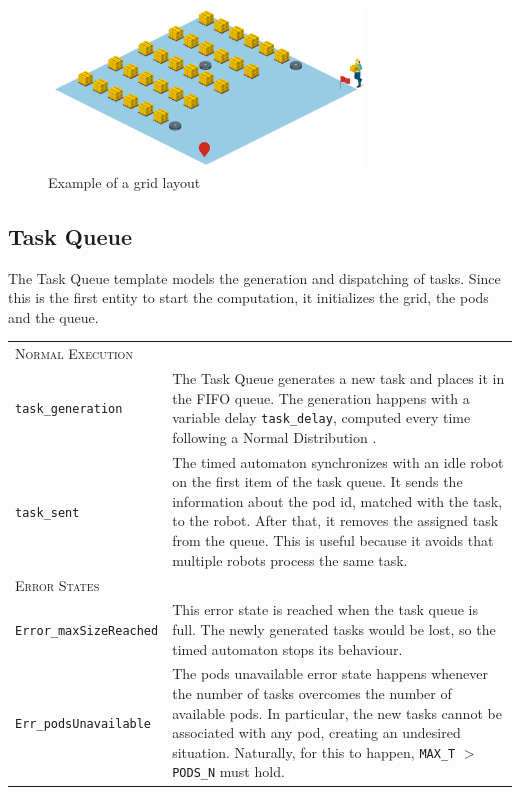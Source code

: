 \begin{figure}
    \centering
    \includegraphics[width=0.75\textwidth]{resources/grid10x10.png}
    \caption{Example of a grid layout}
    \label{fig:grid10x10}
\end{figure}

\subsection{Task Queue}
The Task Queue template models the generation and dispatching of tasks. Since this is the first entity to start the computation, it initializes the grid, the pods and the queue. 

\begin{tabularx}{\textwidth}{lX}
\multicolumn{2}{l}{{\scshape Normal Execution}}
 \vspace{0,2cm}\\
\texttt{task\_generation} & The Task Queue generates a new task and places it in the FIFO queue. The generation happens with a variable delay \texttt{task\_delay}, computed every time following a Normal Distribution \cite{David2015}. \vspace{0,2cm}\\
\texttt{task\_sent} & The timed automaton synchronizes with an idle robot on the first item of the task queue. It sends the information about the pod id, matched with the task, to the robot. After that, it removes the assigned task from the queue. This is useful because it avoids that multiple robots process the same task. \vspace{0,4cm}\\
\multicolumn{2}{l}{{\scshape Error States}} \vspace{0,2cm}\\
\texttt{Error\_maxSizeReached}  & This error state is reached when the task queue is full. The newly generated tasks would be lost, so the timed automaton stops its behaviour. \vspace{0,2cm}\\
\texttt{Err\_podsUnavailable}   & The pods unavailable error state happens whenever the number of tasks overcomes the number of available pods. In particular, the new tasks cannot be associated with any pod, creating an undesired situation. Naturally, for this to happen, \texttt{MAX\_T} $>$ \texttt{PODS\_N} must hold. \vspace{0,2cm}\\
\end{tabularx}

